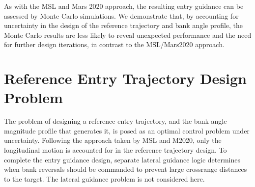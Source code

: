 \documentclass[journal ]{new-aiaa}
\begin{document}


As with the MSL and Mars 2020 approach, the resulting entry guidance can be assessed by Monte Carlo simulations. We demonstrate that, by accounting for uncertainty in the design of the reference trajectory and bank angle profile, the Monte Carlo results are less likely to reveal unexpected performance and the need for further design iterations, in contrast to the MSL/Mars2020 approach. 

\section*{Reference Entry Trajectory Design Problem}
The problem of designing a reference entry trajectory, and the bank angle magnitude profile that generates it, is posed as an optimal control problem under uncertainty. Following the approach taken by MSL and M2020, only the longitudinal motion is accounted for in the reference trajectory design. To complete the entry guidance design, separate lateral guidance logic determines when bank reversals should be commanded to prevent large crossrange distances to the target. The lateral guidance problem is not considered here.
\end{document}
